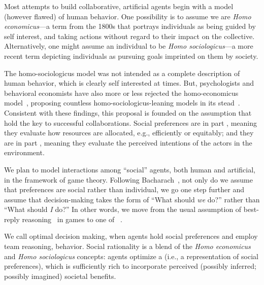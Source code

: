 Most attempts to build collaborative, artificial agents begin with a
model (however flawed) of human behavior.
%
One possibility is to assume we are \emph{Homo economicus}---a term
from the 1800s that portrays individuals as being guided by self interest,
and taking actions without regard to their impact on the collective.
Alternatively, one might assume an individual to be \emph{Homo
  sociologicus}---a more recent term depicting individuals as pursuing
goals imprinted on them by society.

The homo-sociologicus model was not intended as a complete description
of human behavior, which is clearly self interested at times.  But,
psychologists and behavioral economists have also more or less
rejected the homo-economicus model~\cite{Kahnemann, etc.}, proposing
countless homo-sociologicus-leaning models in its stead~\cite{ADD
  CITATIONS}.
%
Consistent with these findings, this proposal is founded on the
assumption that 
 hold the key to successful collaborations.
%
Social preferences are in part , meaning they
evaluate how resources are allocated, e.g., efficiently or equitably;
and they are in part , meaning they evaluate the
perceived intentions of the actors in the environment.

We plan to model interactions among ``social'' agents, both human and
artificial, in the framework of game theory.  
%
Following Bacharach~\cite{2006}, not only do we assume that
preferences are social rather than individual, we go one step further
and assume that decision-making takes the form of ``What should
\emph{we\/} do?'' rather than ``What should \emph{I\/} do?''  In other
words, we move from the usual assumption of best-reply
reasoning~\cite{Cournot} in games to one of ~\cite{TEAM REASONING: Bacharach 1999}.

We call optimal decision making, when agents hold
social preferences and employ team reasoning,  behavior.  Social rationality is a blend of the \emph{Homo
  economicus\/} and \emph{Homo sociologicus\/} concepts: agents
optimize a  (i.e., a representation of
social preferences), which is sufficiently rich to incorporate
perceived (possibly inferred; possibly imagined) societal benefits.

